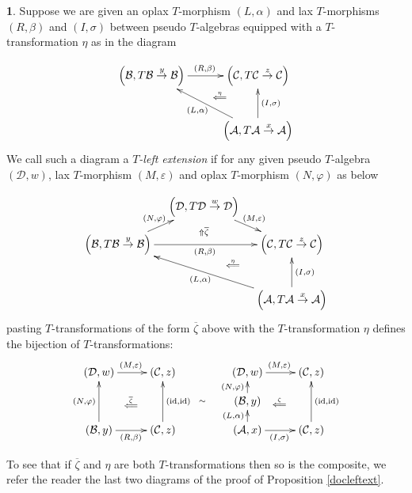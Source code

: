 \documentclass[a4paper,oneside,english]{amsart}
\numberwithin{equation}{section}
\numberwithin{figure}{section}
\theoremstyle{plain}
\theoremstyle{definition}
\newtheorem{defn}[thm]{\protect\definitionname}
\theoremstyle{remark}
\theoremstyle{definition}
\theoremstyle{plain}
\theoremstyle{plain}
\theoremstyle{plain}
\providecommand{\definitionname}{Definition}
\begin{document}
\begin{defn}
Suppose we are given an oplax $T$-morphism $\left(L,\alpha\right)$
and lax $T$-morphisms $\left(R,\beta\right)$ and $\left(I,\sigma\right)$
between pseudo $T$-algebras equipped with a $T$-transformation $\eta$
as in the diagram

\[
\xymatrix@=1em{\left(\mathcal{B},T\mathcal{B}\overset{y}{\rightarrow}\mathcal{B}\right)\ar[rr]^{\left(R,\beta\right)} &  & \left(\mathcal{C},T\mathcal{C}\overset{z}{\rightarrow}\mathcal{C}\right)\ar@{}[ld]|-{\stackrel{\eta}{\Longleftarrow}}\\
 & \;\\
 &  & \left(\mathcal{A},T\mathcal{A}\overset{x}{\rightarrow}\mathcal{A}\right)\ar[uu]_{\left(I,\sigma\right)}\ar[uull]^{\left(L,\alpha\right)}
}
\]
We call such a diagram a \emph{$T$-left extension }if for any given
pseudo $T$-algebra $\left(\mathcal{D},w\right)$, lax $T$-morphism
$\left(M,{\varepsilon}\right)$ and oplax $T$-morphism $\left(N,\varphi\right)$
as below

\[
\xymatrix@=1em{ & \left(\mathcal{D},T\mathcal{D}\overset{w}{\rightarrow}\mathcal{D}\right)\ar[rd]^{\left(M,{\varepsilon}\right)}\\
\left(\mathcal{B},T\mathcal{B}\overset{y}{\rightarrow}\mathcal{B}\right)\ar[rr]_{\left(R,\beta\right)}\ar[ur]^{\left(N,\varphi\right)} & \;\ar@{}[u]|-{\Uparrow\overline{\zeta}} & \left(\mathcal{C},T\mathcal{C}\overset{z}{\rightarrow}\mathcal{C}\right)\ar@{}[ld]|-{\stackrel{\eta}{\Longleftarrow}}\\
 & \;\\
 &  & \left(\mathcal{A},T\mathcal{A}\overset{x}{\rightarrow}\mathcal{A}\right)\ar[uu]_{\left(I,\sigma\right)}\ar[uull]^{\left(L,\alpha\right)}
}
\]
pasting $T$-transformations of the form $\overline{\zeta}$ above
with the $T$-transformation $\eta$ defines the bijection of $T$-transformations:
\[
\xymatrix@=1em{\left(\mathcal{D},w\right)\ar[rr]^{\left(M,{\varepsilon}\right)} &  & \left(\mathcal{C},z\right)\ar@{}[ldld]|-{\stackrel{\overline{\zeta}}{\Longleftarrow}} &  &  & \left(\mathcal{D},w\right)\ar[rr]^{\left(M,{\varepsilon}\right)} &  & \left(\mathcal{C},z\right)\ar@{}[ldld]|-{\stackrel{\zeta}{\Longleftarrow}}\\
 &  &  & \ar@{}[r]|-{\sim} & \; & \left(\mathcal{B},y\right)\ar[u]^{\left(N,\varphi\right)}\\
\left(\mathcal{B},y\right)\ar[rr]_{\left(R,\beta\right)}\ar[uu]^{\left(N,\varphi\right)} &  & \left(\mathcal{C},z\right)\ar[uu]_{\left(\textnormal{id},\textnormal{id}\right)} &  &  & \left(\mathcal{A},x\right)\ar[rr]_{\left(I,\sigma\right)}\ar[u]^{\left(L,\alpha\right)} &  & \left(\mathcal{C},z\right)\ar[uu]_{\left(\textnormal{id},\textnormal{id}\right)}
}
\]

To see that if $\overline{\zeta}$ and $\eta$ are both $T$-transformations
then so is the composite, we refer the reader the last two diagrams
of the proof of Proposition \ref{docleftext}.
\end{defn}
\end{document}
